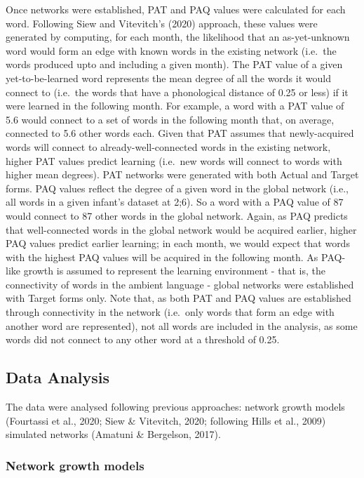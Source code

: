 \documentclass[
  english,
  man,floatsintext]{apa6}
\begin{document}
Once networks were established, PAT and PAQ values were calculated for each word. Following Siew and Vitevitch's (2020) approach, these values were generated by computing, for each month, the likelihood that an as-yet-unknown word would form an edge with known words in the existing network (i.e.~the words produced upto and including a given month). The PAT value of a given yet-to-be-learned word represents the mean degree of all the words it would connect to (i.e.~the words that have a phonological distance of 0.25 or less) if it were learned in the following month. For example, a word with a PAT value of 5.6 would connect to a set of words in the following month that, on average, connected to 5.6 other words each. Given that PAT assumes that newly-acquired words will connect to already-well-connected words in the existing network, higher PAT values predict learning (i.e.~new words will connect to words with higher mean degrees). PAT networks were generated with both Actual and Target forms. PAQ values reflect the degree of a given word in the global network (i.e., all words in a given infant's dataset at 2;6). So a word with a PAQ value of 87 would connect to 87 other words in the global network. Again, as PAQ predicts that well-connected words in the global network would be acquired earlier, higher PAQ values predict earlier learning; in each month, we would expect that words with the highest PAQ values will be acquired in the following month. As PAQ-like growth is assumed to represent the learning environment - that is, the connectivity of words in the ambient language - global networks were established with Target forms only. Note that, as both PAT and PAQ values are established through connectivity in the network (i.e.~only words that form an edge with another word are represented), not all words are included in the analysis, as some words did not connect to any other word at a threshold of 0.25.

\hypertarget{data-analysis}{%
\subsection{Data Analysis}\label{data-analysis}}

The data were analysed following previous approaches: network growth models (Fourtassi et al., 2020; Siew \& Vitevitch, 2020; following Hills et al., 2009) simulated networks (Amatuni \& Bergelson, 2017).

\hypertarget{network-growth-models}{%
\subsubsection{Network growth models}\label{network-growth-models}}
\end{document}
